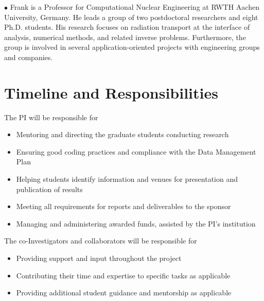 \documentclass[12pt]{article}
\begin{document}
$\bullet$ Frank is a Professor for Computational Nuclear Engineering at RWTH Aachen University, Germany.
He leads a group of two postdoctoral researchers and eight Ph.D. students.
His research focuses on radiation transport at the interface of analysis, numerical methods, and related inverse problems.
Furthermore, the group is involved in several application-oriented projects with engineering groups and companies.


\section{Timeline and Responsibilities}

The PI will be responsible for
\begin{itemize}[noitemsep]
\item Mentoring and directing the graduate students conducting research
\item Ensuring good coding practices and compliance with the Data Management Plan
\item Helping students identify information and venues for presentation and publication of results
\item Meeting all requirements for reports and deliverables to the sponsor
\item Managing and administering awarded funds, assisted by the PI's institution
\end{itemize}

The co-Investigators and collaborators will be responsible for
\begin{itemize}[noitemsep]
\item Providing support and input throughout the project
\item Contributing their time and expertise to specific tasks as applicable
\item Providing additional student guidance and mentorship as applicable
\end{itemize}
\end{document}
